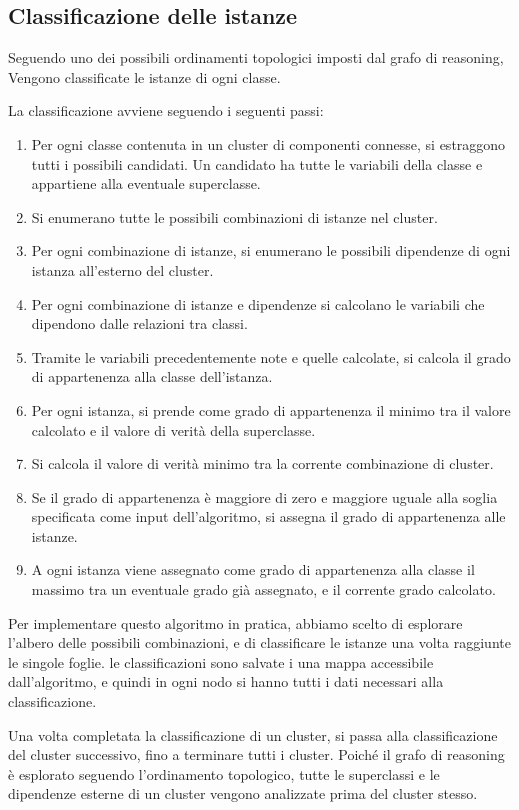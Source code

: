 \subsection{Classificazione delle istanze}

Seguendo uno dei possibili ordinamenti topologici imposti dal grafo di reasoning, Vengono classificate le istanze di ogni classe.

La classificazione avviene seguendo i seguenti passi:

\begin{enumerate}
 \item Per ogni classe contenuta in un cluster di componenti connesse, si estraggono tutti i possibili candidati. Un candidato ha tutte le variabili della classe e appartiene alla eventuale superclasse.
 \item Si enumerano tutte le possibili combinazioni di istanze nel cluster.
 \item Per ogni combinazione di istanze, si enumerano le possibili dipendenze di ogni istanza all'esterno del cluster.
 \item Per ogni combinazione di istanze e dipendenze si calcolano le variabili che dipendono dalle relazioni tra classi.
 \item Tramite le variabili precedentemente note e quelle calcolate, si calcola il grado di appartenenza alla classe dell'istanza.
 \item Per ogni istanza, si prende come grado di appartenenza il minimo tra il valore calcolato e il valore di verità della superclasse.
 \item Si calcola il valore di verità minimo tra la corrente combinazione di cluster.
 \item Se il grado di appartenenza è maggiore di zero e maggiore uguale alla soglia specificata come input dell'algoritmo, si assegna il grado di appartenenza alle istanze.
 \item A ogni istanza viene assegnato come grado di appartenenza alla classe il massimo tra un eventuale grado già assegnato, e il corrente grado calcolato. 
\end{enumerate}

Per implementare questo algoritmo in pratica, abbiamo scelto di esplorare l'albero delle possibili combinazioni, e di classificare le istanze una volta raggiunte le singole foglie. le classificazioni sono salvate i una mappa accessibile dall'algoritmo, e quindi in ogni nodo si hanno tutti i dati necessari alla classificazione.

Una volta completata la classificazione di un cluster, si passa alla classificazione del cluster successivo, fino a terminare tutti i cluster. Poiché il grafo di reasoning è esplorato seguendo l'ordinamento topologico, tutte le superclassi e le dipendenze esterne di un cluster vengono analizzate prima del cluster stesso.

